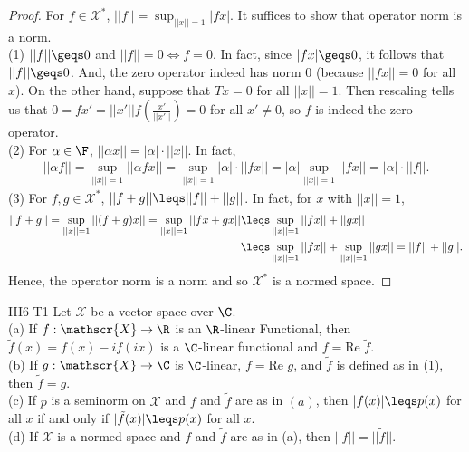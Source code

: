 \begin{proof}
    For $f\in \mathscr{X}^*$, $||f||=\sup_{||x||= 1}|fx|$.
    It suffices to show that operator norm is a norm. \\
    (1) $||f||\geqs 0$ and $||f||=0\Leftrightarrow f=0$. In fact, since $|fx|\geqs 0$, it follows that $||f||\geqs 0$. 
    And, the zero operator indeed has norm $0$ (because $||fx||=0$ for all $x$). On the other hand,
    suppose that $Tx=0$ for all $||x||=1$. Then rescaling tells us that $0=fx'=||x'||f(\frac{x'}{||x'||})=0$ for all $x'\neq 0$,
    so $f$ is indeed the zero operator.\\
    (2) For $\alpha\in\F$, $||\alpha x||=|\alpha|\cdot||x||$. In fact, 
    \begin{align*}
        ||\alpha f||=\sup_{||x||=1}||\alpha fx||=\sup_{||x||=1}|\alpha|\cdot||fx||=|\alpha| \sup_{||x||=1} ||fx||=|\alpha|\cdot||f||.
    \end{align*} 
    (3) For $f,g\in \mathscr{X}^*$, $||f+g||\leqs ||f||+||g||$. In fact, for $x$ with $||x||=1$,
    \begin{align*}
        ||f+g||=\sup_{||x||=1}||(f+g)x||=\sup_{||x||=1}||fx+gx||&\leqs \sup_{||x||=1}||fx||+||gx||\\
                                                                &\leqs \sup_{||x||=1}||fx|| + \sup_{||x||=1}||gx|| = ||f||+||g||.
    \end{align*}
    Hence, the operator norm is a norm and so $\mathscr{X}^*$ is a normed space.
\end{proof}

\begin{exercise}{III6 T1}{}
    Let $\mathscr{X}$ be a vector space over $\C$.\\
    (a) If $f:\mathscr{X}\rightarrow \R$ is an $\R$-linear Functional, then
    $\tilde{f}(x)=f(x)-if(ix)$ is a $\C$-linear functional and $f=\text{Re }\tilde{f}$.\\
    (b) If $g:\mathscr{X}\rightarrow \C$ is $\C$-linear, $f=\text{Re }g$, and $\tilde{f}$ is defined as in (1), then $\tilde{f}=g$.\\
    (c) If $p$ is a seminorm on $\mathscr{X}$ and $f$ and $\tilde{f}$ are as in $(a)$,
    then $|f(x)|\leqs p(x)$ for all $x$ if and only if $|\tilde{f}(x)|\leqs p(x)$ for all $x$.\\
    (d) If $\mathscr{X}$ is a normed space and $f$ and $\tilde{f}$ are as in (a), then $||f||=||\tilde{f}||$.
\end{exercise}

